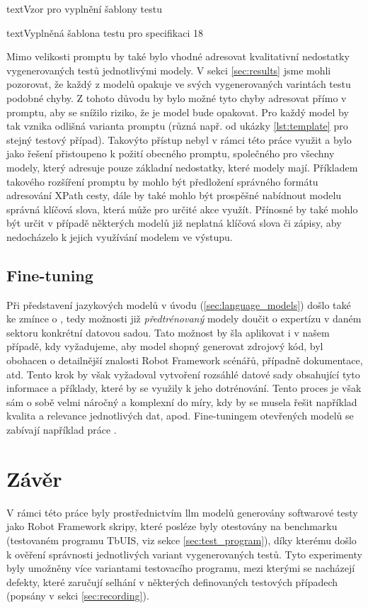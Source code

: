 \documentclass[czech, ma, kiv, he, iso690numb, pdf, viewonly]{fasthesis}
\begin{document}
\begin{code}{text}{Vzor pro vyplnění šablony testu \label{lst:template}}
{\begin{code}{text}{Vyplněná šablona testu pro specifikaci 18 \label{lst:spec18}}
{    Mimo velikosti promptu by také bylo vhodné adresovat kvalitativní nedostatky vygenerovaných testů jednotlivými modely. V sekci \ref{sec:results} jsme mohli pozorovat, že každý z modelů opakuje ve svých vygenerovaných varintách testu podobné chyby. Z tohoto důvodu by bylo možné tyto chyby adresovat přímo v promptu, aby se snížilo riziko, že je model bude opakovat. Pro každý model by tak vznika odlišná varianta promptu (různá např. od ukázky \ref{lst:template} pro stejný testový případ). Takovýto přístup nebyl v rámci této práce využit a bylo jako řešení přistoupeno k požití obecného promptu, společného pro všechny modely, který adresuje pouze základní nedostatky, které modely mají. Příkladem takového rozšíření promptu by mohlo být předložení správného formátu adresování XPath cesty, dále by také mohlo být prospěšné nabídnout modelu správná klíčová slova, která může pro určité akce využít. Přínosné by také mohlo být určit v případě některých modelů již neplatná klíčová slova či zápisy, aby nedocházelo k jejich využívání modelem ve výstupu.

    \section{Fine-tuning}

    Při představení jazykových modelů v úvodu (\ref{sec:language_models}) došlo také ke zmínce o , tedy možnosti již \textit{předtrénovaný} modely doučit o expertízu v daném sektoru konkrétní datovou sadou. Tato možnost by šla aplikovat i v našem případě, kdy vyžadujeme, aby model shopný generovat zdrojový kód, byl obohacen o detailnější znalosti Robot Framework scénářů, případně dokumentace, atd. Tento krok by však vyžadoval vytvoření rozsáhlé datové sady obsahující tyto informace a příklady, které by se využily k jeho dotrénování. Tento proces je však sám o sobě velmi náročný a komplexní do míry, kdy by se musela řešit například kvalita a relevance jednotlivých dat, apod. Fine-tuningem otevřených modelů se zabívají například práce \cite{weyssow2024exploring, shi2024deep}.

\chapter{Závěr}
    
    V rámci této práce byly prostřednictvím \Gls{llm} modelů generovány softwarové testy jako Robot Framework skripy, které posléze byly otestovány na benchmarku (testovaném programu TbUIS, viz sekce \ref{sec:test_program}), díky kterému došlo k ověření správnosti jednotlivých variant vygenerovaných testů. Tyto experimenty byly umožněny více variantami testovacího programu, mezi kterými se nacházejí defekty, které zaručují selhání v některých definovaných testových případech (popsány v sekci \ref{sec:recording}). 

}
\end{code}}
\end{code}
\end{document}
